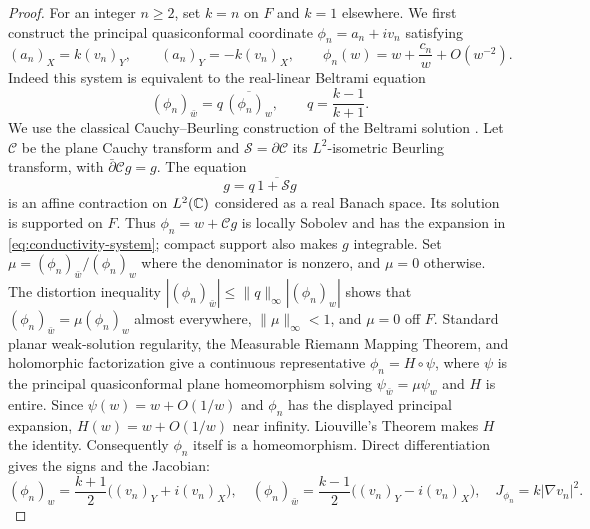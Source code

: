 \begin{proof}
For an integer $n\ge2$, set $k=n$ on $F$ and $k=1$ elsewhere. We first
construct the principal quasiconformal coordinate $\phi_n=a_n+iv_n$
satisfying
\begin{equation}\label{eq:conductivity-system}
 (a_n)_X=k(v_n)_Y,\qquad (a_n)_Y=-k(v_n)_X,
 \qquad
 \phi_n(w)=w+\frac{c_n}{w}+O(w^{-2}).
\end{equation}
Indeed this system is equivalent to the real-linear Beltrami equation
\[
 (\phi_n)_{\bar w}=q\,\overline{(\phi_n)_w},
 \qquad q=\frac{k-1}{k+1}.
\]
We use the classical Cauchy--Beurling construction of the Beltrami
solution \cite[Sections~1--3]{AhlforsBers1960}.  Let $\mathcal C$ be the plane Cauchy transform and
$\mathcal S=\partial\mathcal C$ its $L^2$-isometric Beurling transform,
with $\bar\partial\mathcal C g=g$. The equation
\[
 g=q\,\overline{1+\mathcal Sg}
\]
is an affine contraction on $L^2(\mathbb C)$ considered as a real Banach space.
Its solution is supported on $F$. Thus $\phi_n=w+\mathcal Cg$ is locally
Sobolev and has the expansion in \eqref{eq:conductivity-system}; compact
support also makes $g$ integrable. Set
$\mu=(\phi_n)_{\bar w}/(\phi_n)_w$ where the denominator is nonzero,
and $\mu=0$ otherwise. The distortion inequality
$|(\phi_n)_{\bar w}|\le\|q\|_\infty|(\phi_n)_w|$ shows that
$(\phi_n)_{\bar w}=\mu(\phi_n)_w$ almost everywhere,
$\|\mu\|_\infty<1$, and $\mu=0$ off $F$. Standard planar weak-solution
regularity, the Measurable Riemann Mapping Theorem, and holomorphic
factorization \cite{AhlforsBers1960,Ahlfors2006,AstalaIwaniecMartin2009} give a continuous representative
$\phi_n=H\circ\psi$, where $\psi$ is the principal quasiconformal
plane homeomorphism solving $\psi_{\bar w}=\mu\psi_w$ and $H$ is entire.
Since $\psi(w)=w+O(1/w)$ and $\phi_n$ has the displayed principal
expansion, $H(w)=w+O(1/w)$ near infinity. Liouville's Theorem makes
$H$ the identity. Consequently $\phi_n$ itself is a homeomorphism.
Direct differentiation
gives the signs and the Jacobian:
\begin{equation}\label{eq:conductivity-derivatives}
 (\phi_n)_w=\frac{k+1}{2}\bigl((v_n)_Y+i(v_n)_X\bigr),\quad
 (\phi_n)_{\bar w}=\frac{k-1}{2}\bigl((v_n)_Y-i(v_n)_X\bigr),\quad
 J_{\phi_n}=k|\nabla v_n|^2.
\end{equation}


\end{proof}
